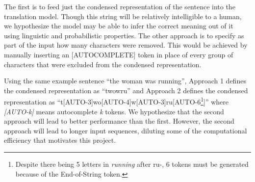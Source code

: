 The first is to feed just the condensed representation of the sentence into the translation model. Though this string will be relatively intelligible to a human, we hypothesize the model may be able to infer the correct meaning out of it using linguistic and probabilistic properties. The other approach is to specify as part of the input how many characters were removed. This would be achieved by manually inserting an [AUTOCOMPLETE] token in place of every group of characters that were excluded from the condensed representation. 

Using the same example sentence “the woman was running”, Approach 1 defines the condensed representation as “twowru” and Approach 2 defines the condensed representation as “t[AUTO-3]wo[AUTO-4]w[AUTO-3]ru[AUTO-6\footnote{Despite there being 5 letters in \textit{running} after ru-, 6 tokens must be generated because of the End-of-String token.}]” where \textit{[AUTO-k]} means autocomplete \textit{k} tokens. We hypothesize that the second approach will lead to better performance than the first. However, the second approach will lead to longer input sequences, diluting some of the computational efficiency that motivates this project.  